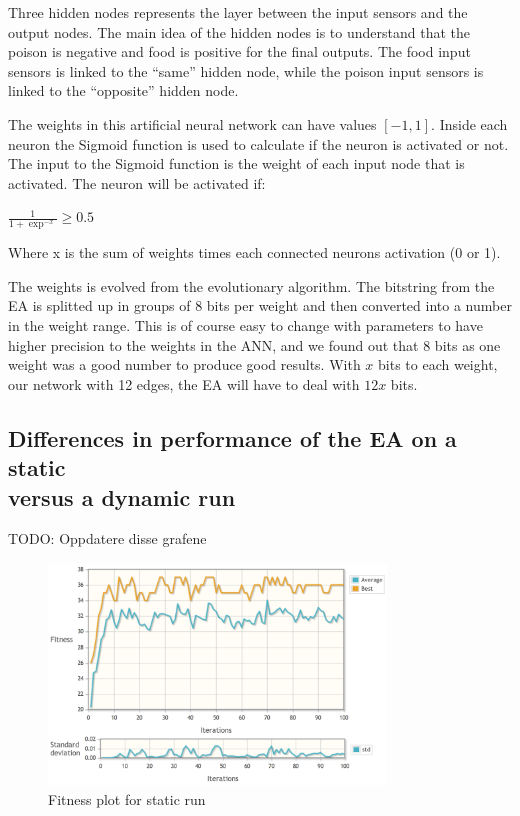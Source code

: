 Three hidden nodes represents the layer between the input sensors and the output nodes. The main idea of the hidden nodes is to understand that the poison is negative and food is positive for the final outputs. The food input sensors is linked to the ``same'' hidden node, while the poison input sensors is linked to the ``opposite'' hidden node. 

The weights in this artificial neural network can have values $[-1, 1]$. Inside each neuron the Sigmoid function is used to calculate if the neuron is activated or not. The input to the Sigmoid function is the weight of each input node that is activated. The neuron will be activated if:

\begin{center}
	$\frac{1}{1 + \exp^{-x}} \geq 0.5$
\end{center}

Where x is the sum of weights times each connected neurons activation (0 or 1).

The weights is evolved from the evolutionary algorithm. The bitstring from the EA is splitted up in groups of 8 bits per weight and then converted into a number in the weight range. This is of course easy to change with parameters to have higher precision to the weights in the ANN, and we found out that 8 bits as one weight was a good number to produce good results. With $x$ bits to each weight, our network with 12 edges, the EA will have to deal with $12x$ bits.

\subsection{Differences in performance of the EA on a static \\versus a dynamic run}

TODO: Oppdatere disse grafene

\begin{figure}[H]
  \centering
    \includegraphics[width=0.8\textwidth]{img/Flatland_static}
    \caption{Fitness plot for static run}
\end{figure}

